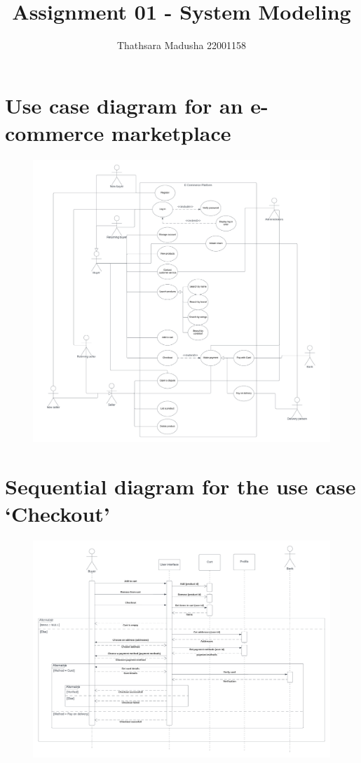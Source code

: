 \documentclass{article}
\title{Assignment 01 - System Modeling}
\author{Thathsara Madusha 22001158}
\begin{document}
    \maketitle

    \section{Use case diagram for an e-commerce marketplace}\label{sec:usecase}
    \begin{figure}[H]
        \label{fig:usecase_diagram}
        \includegraphics[width=\textwidth]{usecase}
    \end{figure}

    \newpage

    \section{Sequential diagram for the use case `Checkout'}\label{sec:seq}
    \begin{figure}[H]
        \label{fig:sequence_diagram}
        \includegraphics[width=\textwidth]{seq}
    \end{figure}
\end{document}
